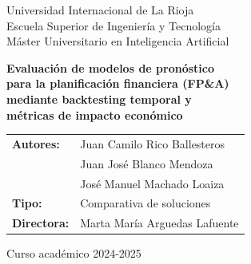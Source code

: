 \documentclass[12pt, a4paper, oneside]{report}
\begin{document}
\begin{titlepage}
  \thispagestyle{empty}
  \centering
  \vspace*{1cm}

  {\calibrilight\fontsize{16}{20}\selectfont\color{unirblue}
    Universidad Internacional de La Rioja\\[0.3cm]
    Escuela Superior de Ingeniería y Tecnología\\[0.3cm]
    Máster Universitario en Inteligencia Artificial
  }

  \vspace{2.5cm}

  {\calibrilight\fontsize{20}{26}\selectfont\bfseries\color{unirblue}
    Evaluación de modelos de pronóstico\\[0.2cm]
    para la planificación financiera (FP\&A)\\[0.2cm]
    mediante backtesting temporal y\\[0.2cm]
    métricas de impacto económico
  }

  \vspace{3cm}

  {\fontsize{13}{17}\selectfont
    \begin{tabular}{ll}
      \textbf{Autores:}   & Juan Camilo Rico Ballesteros \\
                          & Juan José Blanco Mendoza \\
                          & José Manuel Machado Loaiza \\[0.5cm]
      \textbf{Tipo:}      & Comparativa de soluciones \\[0.3cm]
      \textbf{Directora:} & Marta María Arguedas Lafuente \\
    \end{tabular}
  }

  \vfill
  {\fontsize{12}{15}\selectfont Curso académico 2024-2025}
\end{titlepage}




\clearpage
\tableofcontents
\clearpage
\listoftables
\clearpage
\listoffigures
\clearpage



\setcounter{page}{1}
\end{document}
